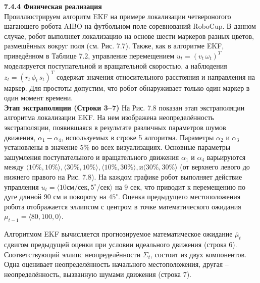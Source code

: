 \documentclass[10pt,a4paper]{article}
\begin{document}
\textbf{7.4.4 Физическая реализация}\\

Проиллюстрируем алгоритм EKF на примере локализации четвероногого шагающего робота AIBO на футбольном поле соревнований RoboCup. В данном случае, робот выполняет локализацию на основе шести маркеров разных цветов, размещённых вокруг поля (см. Рис. 7.7). Также, как в алгоритме EKF, приведённом в Таблице 7.2, управление перемещением $u_t = (v_t\, \omega_t)^T$ моделируется поступательной и вращательной скоростью, а наблюдения $z_t = (r_t\, \phi_t\, s_t)^T$ содержат значения относительного расстояния и направления на маркер. 
Для простоты допустим, что робот обнаруживает только один маркер в один момент времени.\\

\textbf{Этап экстраполяции (Строки 3–7)} На Рис. 7.8 показан этап экстраполяции алгоритма локализации EKF. На нем изображена неопределённость экстраполяции, появившаяся в результате различных параметров шумов движения, $\alpha_1-\alpha_4$, используемых в строке 5 алгоритма. Параметры $\alpha_2$ и $\alpha_3$ установлены в значение 5\% во всех визуализациях.
Основные параметры зашумления поступательного и вращательного движения $\alpha_1$ и $\alpha_4$ варьируются между $\langle10\%, 10\%\rangle, \langle30\%, 10\%\rangle, \langle10\%, 30\%\rangle, и \langle30\%, 30\%\rangle$ (от верхнего левого до нижнего правого на Рис. 7.8). На каждом графике робот выполняет действие управления $u_t = \langle10 \text{см/сек}, 5^\circ\text{/сек}\rangle$ на 9 сек, что приводит к перемещению по дуге длиной 90 см и повороту на $45^\circ$. Оценка предыдущего местоположения робота отображается эллипсом с центром в точке математического ожидания $\mu_{t-1} = \langle80, 100, 0\rangle$.

Алгоритмом EKF вычисляется прогнозируемое математическое ожидание $\bar{\mu}_t$ сдвигом предыдущей оценки при условии идеального движения (строка 6). Соответствующий эллипс неопределённости $\bar{\varSigma}_t$, состоит из двух компонентов. Одна оценивает неопределённость начального местоположения, другая – неопределённость, вызванную шумами движения (строка 7). 
\end{document}

